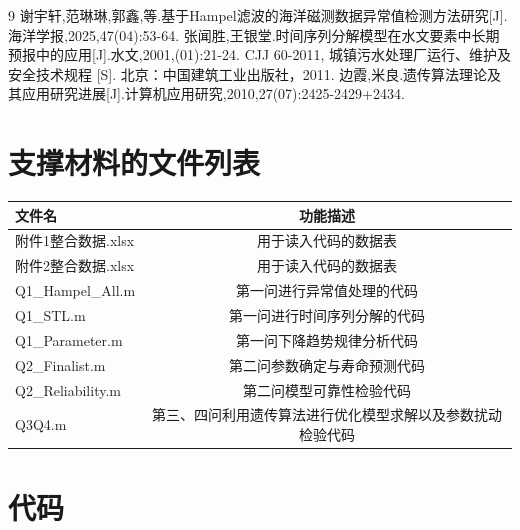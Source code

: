 \documentclass[withoutpreface,bwprint]{cumcmthesis}
\begin{document}

\newpage

\nocite{*}
\begin{thebibliography}{9}%
 谢宇轩,范琳琳,郭鑫,等.基于Hampel滤波的海洋磁测数据异常值检测方法研究[J].海洋学报,2025,47(04):53-64.
 张闻胜,王银堂.时间序列分解模型在水文要素中长期预报中的应用[J].水文,2001,(01):21-24.
 CJJ 60-2011, 城镇污水处理厂运行、维护及安全技术规程 [S]. 北京：中国建筑工业出版社，2011.
 边霞,米良.遗传算法理论及其应用研究进展[J].计算机应用研究,2010,27(07):2425-2429+2434.
\end{thebibliography}
\begin{appendices}
\section{支撑材料的文件列表}
\begin{table}[H]
	\centering
	\setlength{\tabcolsep}{6pt}
	\renewcommand{\arraystretch}{1.5}
	\label{tab:支撑材料}
	\begin{tabular}{lc}
		\toprule
		\textbf{文件名} & \textbf{功能描述} \\
		\midrule
		\rowcolor{LightBlue}
		附件1整合数据.xlsx & 用于读入代码的数据表 \\
		附件2整合数据.xlsx & 用于读入代码的数据表 \\
		\rowcolor{LightBlue}
		Q1\_Hampel\_All.m & 第一问进行异常值处理的代码 \\
		Q1\_STL.m & 第一问进行时间序列分解的代码 \\
		\rowcolor{LightBlue}
		Q1\_Parameter.m & 第一问下降趋势规律分析代码 \\
		Q2\_Finalist.m & 第二问参数确定与寿命预测代码 \\
		\rowcolor{LightBlue}
		Q2\_Reliability.m & 第二问模型可靠性检验代码 \\
		Q3Q4.m & 第三、四问利用遗传算法进行优化模型求解以及参数扰动检验代码 \\
		\bottomrule
	\end{tabular}
\end{table}

\section{代码}
%

%

%

%

%

%
\end{appendices}
\end{document}

